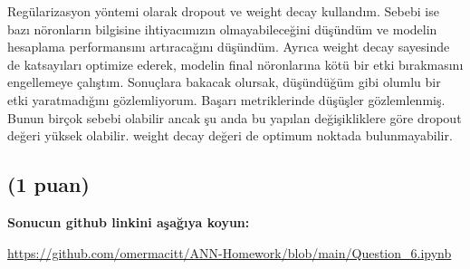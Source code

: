 \documentclass[11pt]{article}
\begin{document}
Regülarizasyon yöntemi olarak dropout ve weight decay kullandım. Sebebi ise bazı nöronların bilgisine ihtiyacımızın olmayabileceğini düşündüm ve modelin hesaplama performansını artıracağını düşündüm. Ayrıca weight decay sayesinde de katsayıları optimize ederek, modelin final nöronlarına kötü bir etki bırakmasını engellemeye çalıştım. Sonuçlara bakacak olursak, düşündüğüm gibi olumlu bir etki yaratmadığını gözlemliyorum. Başarı metriklerinde düşüşler gözlemlenmiş. Bunun birçok sebebi olabilir ancak şu anda bu yapılan değişikliklere göre dropout değeri yüksek olabilir. weight decay değeri de optimum noktada bulunmayabilir.

\subsection{(1 puan)} \textbf{Sonucun github linkini  aşağıya koyun:}

\url{https://github.com/omermacitt/ANN-Homework/blob/main/Question_6.ipynb}
\end{document}

